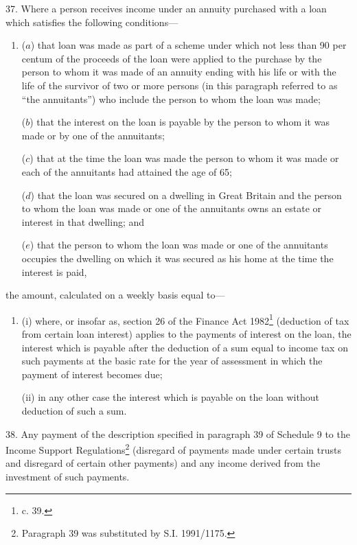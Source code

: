 \documentclass[a4paper]{article}
\begin{document}
37.  Where a person receives income under an annuity purchased with a loan which satisfies the following conditions—
\begin{enumerate}\item[]
($a$) that loan was made as part of a scheme under which not less than 90 per centum of the proceeds of the loan were applied to the purchase by the person to whom it was made of an annuity ending with his life or with the life of the survivor of two or more persons (in this paragraph referred to as “the annuitants”) who include the person to whom the loan was made;

($b$) that the interest on the loan is payable by the person to whom it was made or by one of the annuitants;

($c$) that at the time the loan was made the person to whom it was made or each of the annuitants had attained the age of 65;

($d$) that the loan was secured on a dwelling in Great Britain and the person to whom the loan was made or one of the annuitants owns an estate or interest in that dwelling; and

($e$) that the person to whom the loan was made or one of the annuitants occupies the dwelling on which it was secured as his home at the time the interest is paid,
\end{enumerate}
the amount, calculated on a weekly basis equal to—
\begin{enumerate}\item[]
(i) where, or insofar as, section 26 of the Finance Act 1982\footnote{ c. 39.} (deduction of tax from certain loan interest) applies to the payments of interest on the loan, the interest which is payable after the deduction of a sum equal to income tax on such payments at the basic rate for the year of assessment in which the payment of interest becomes due;

(ii) in any other case the interest which is payable on the loan without deduction of such a sum.
\end{enumerate}

\medskip

38.  Any payment of the description specified in paragraph 39 of Schedule 9 to the Income Support Regulations\footnote{\frenchspacing Paragraph 39 was substituted by S.I. 1991/1175.} (disregard of payments made under certain trusts and disregard of certain other payments) and any income derived from the investment of such payments.

\medskip
\end{document}
